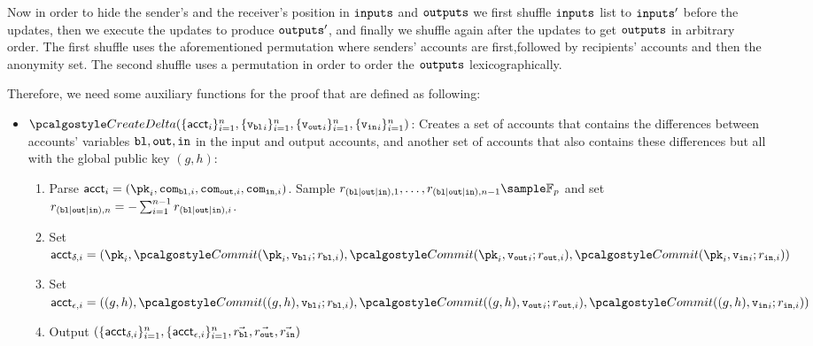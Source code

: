 Now in order to hide the sender's and the receiver's position in ${\textup{\texttt{inputs}}}$ and ${\textup{\texttt{outputs}}}$ we first shuffle ${\textup{\texttt{inputs}}}$ list to ${\textup{\texttt{inputs}}}'$ before the updates, then we execute the updates to produce ${\textup{\texttt{outputs}}}'$, and finally we shuffle again after the updates to get ${\textup{\texttt{outputs}}}$ in arbitrary order. The first shuffle uses the aforementioned permutation where senders' accounts are first,followed by recipients' accounts and then the anonymity set. The second shuffle uses a permutation in order to order the ${\textup{\texttt{outputs}}}$ lexicographically.

Therefore, we need some auxiliary functions for the proof that are defined as following:

\begin{itemize}
    \item $\createdelta(\{\acct_i\}_{i=1}^{n}, \{{\vbl}_i\}_{i=1}^{n}, \{{\vout}_i\}_{i=1}^{n}, \{{\vin}_i\}_{i=1}^{n})$: Creates a set of accounts that contains the differences between accounts' variables $\textup{\texttt{{bl}}}, \textup{\texttt{{out}}}, \textup{\texttt{{in}}}$ in the input and output accounts, and another set of accounts that also contains these differences but all with the global public key $(g,h)$:
    \begin{enumerate}
        \item Parse $\acct_i = (\pk_i, \com_{\varbl,i}, \com_{\varout,i}, \com_{\varin,i})$. Sample $r_{(\varbl|\varout|\varin),1}, \dots, r_{ (\varbl|\varout|\varin),n-1} \sample \mathbb{F}_p$ and set $r_{(\textup{\texttt{{bl}}}|\textup{\texttt{{out}}}|\textup{\texttt{{in}}}),n} = -\sum_{i=1}^{n-1} r_{(\textup{\texttt{{bl}}}|\textup{\texttt{{out}}}|\textup{\texttt{{in}}}),i}$. 
        \item Set $\acct_{\delta,i} = (\pk_i, \commit(\pk_i,{\vbl}_i; r_{\varbl,i}), \commit(\pk_i,{\vout}_i; r_{\varout,i}), \commit(\pk_i,{\vin}_i; r_{\varin,i}))$
        \item Set $\acct_{\epsilon,i} = ((g,h), \commit((g,h),{\vbl}_i; r_{\varbl,i}), \commit((g,h),{\vout}_i; r_{\varout,i}), \commit((g,h),{\vin}_i; r_{\varin,i}))$
        \item Output $(\{\textup{\textsf{acct}}_{\delta,i}\}_{i=1}^n, \{\textup{\textsf{acct}}_{\epsilon,i}\}_{i=1}^n, \vec{r_{\textup{\texttt{{bl}}}}}, \vec{r_{\textup{\texttt{{out}}}}}, \vec{r_{\textup{\texttt{{in}}}}})$
    \end{enumerate}
    \vspace{0.3cm}


\end{itemize}
